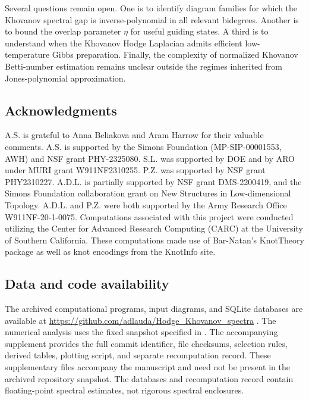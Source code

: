 \documentclass[a4paper,onecolumn,unpublished]{quantumarticle}
\theoremstyle{plain}
\theoremstyle{definition}
\theoremstyle{definition}
\numberwithin{equation}{section}
\begin{document}
Several questions remain open.  One is to identify diagram families for which the Khovanov spectral gap is inverse-polynomial in all relevant bidegrees.  Another is to bound the overlap parameter \(\eta\) for useful guiding states.  A third is to understand when the Khovanov Hodge Laplacian admits efficient low-temperature Gibbs preparation.  Finally, the complexity of normalized Khovanov Betti-number estimation remains unclear outside the regimes inherited from Jones-polynomial approximation.

\subsection*{Acknowledgments}
A.S. is grateful to Anna Beliakova and Aram Harrow for their valuable comments. A.S. is supported by the Simons Foundation (MP-SIP-00001553, AWH) and NSF grant PHY-2325080. S.L. was supported by DOE and by ARO under MURI grant W911NF2310255. P.Z. was supported by NSF grant PHY2310227. A.D.L. is partially supported by NSF grant DMS-2200419, and the Simons Foundation collaboration grant on New Structures in Low-dimensional Topology. A.D.L. and P.Z. were both supported by the Army Research Office W911NF-20-1-0075. Computations associated with this project were conducted utilizing the Center for Advanced Research Computing (CARC) at the University of Southern California. These computations made use of Bar-Natan's KnotTheory package as well as knot encodings from the KnotInfo site.

\subsection*{Data and code availability}
The archived computational programs, input diagrams, and SQLite databases are available at \url{https://github.com/adlauda/Hodge_Khovanov_spectra} \cite{hodge_khovanov_spectra}. The numerical analysis uses the fixed snapshot specified in . The accompanying supplement provides the full commit identifier, file checksums, selection rules, derived tables, plotting script, and separate recomputation record. These supplementary files accompany the manuscript and need not be present in the archived repository snapshot. The databases and recomputation record contain floating-point spectral estimates, not rigorous spectral enclosures.


\appendix
\end{document}
